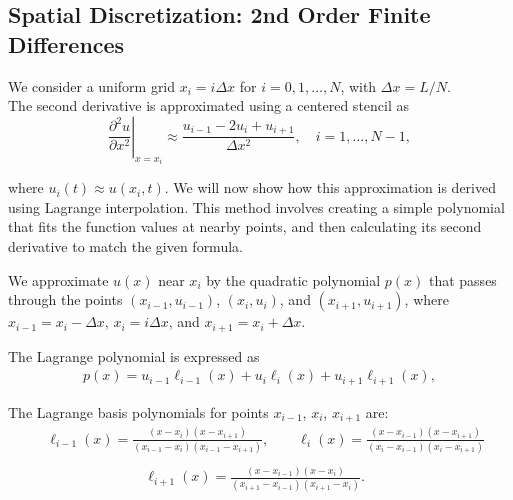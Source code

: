 \clearpage

\subsection{Spatial Discretization: 2nd Order Finite Differences}

We consider a uniform grid $x_i = i \Delta x$ for $i=0,1,\dots,N$, with $\Delta x = L/N$. \\ The second derivative is approximated using a centered stencil as
\begin{equation}
\left.\frac{\partial^2 u}{\partial x^2}\right|_{x=x_i} \approx \frac{u_{i-1} - 2u_i + u_{i+1}}{\Delta x^2}, \quad i=1,\dots,N-1,
\label{eq:second_derivative}
\end{equation}

where $u_i(t) \approx u(x_i,t)$. We will now show how this approximation is derived using Lagrange interpolation. This method involves creating a simple polynomial that fits the function values at nearby points, and then calculating its second derivative to match the given formula.


We approximate $u(x)$ near $x_i$ by the quadratic polynomial $p(x)$ that passes through the points $(x_{i-1}, u_{i-1})$, $(x_i, u_i)$, and $(x_{i+1}, u_{i+1})$, where $x_{i-1} = x_i - \Delta x$, $x_i = i \Delta x$, and $x_{i+1} = x_i + \Delta x$.

The Lagrange polynomial is expressed as
\begin{equation}
\begin{aligned}
p(x) = u_{i-1} \ell_{i-1}(x) + u_i \ell_i(x) + u_{i+1} \ell_{i+1}(x),
\label{eq:lagrange_polynomial}
\end{aligned}
\end{equation}

The Lagrange basis polynomials for points $x_{i-1}$, $x_i$, $x_{i+1}$ are:
\begin{equation}
\begin{aligned}
&\ell_{i-1}(x) = \frac{(x - x_i)(x - x_{i+1})}{(x_{i-1} - x_i)(x_{i-1} - x_{i+1})}, \qquad
\ell_i(x) = \frac{(x - x_{i-1})(x - x_{i+1})}{(x_i - x_{i-1})(x_i - x_{i+1})} \\ \\
&\hspace{7em} \ell_{i+1}(x) = \frac{(x - x_{i-1})(x - x_i)}{(x_{i+1} - x_{i-1})(x_{i+1} - x_i)}.
\end{aligned}
\label{eq:lagrange_basis}
\end{equation}

